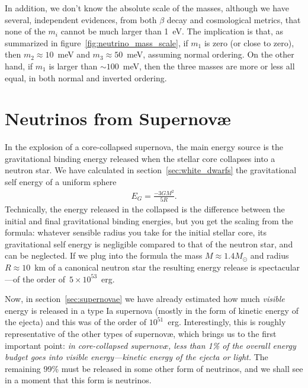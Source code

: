 In addition, we don't know the absolute scale of the masses, although we have several,
independent evidences, from both $\beta$ decay and cosmological metrics, that none
of the $m_i$ cannot be much larger than 1~eV. The implication is that, as summarized in
figure~\ref{fig:neutrino_mass_scale}, if $m_1$ is zero (or close to zero), then
$m_2 \approx 10$~meV and $m_3 \approx 50$~meV, assuming normal ordering. On the
other hand, if $m_1$ is larger than $\sim 100$~meV, then the three masses are more
or less all equal, in both normal and inverted ordering.

\section{Neutrinos from Supernov\ae}

In the explosion of a core-collapsed supernova, the main energy source is the
gravitational binding energy released when the stellar core collapses into a
neutron star. We have calculated in section~\ref{sec:white_dwarfs} the
gravitational self energy of a uniform sphere
\begin{align*}
  E_G = \frac{-3 G M^2}{5R}.
\end{align*}
Technically, the energy released in the collapsed is the difference between the
initial and final gravitational binding energies, but you get the scaling from the
formula: whatever sensible radius you take for the initial stellar core, its
gravitational self energy is negligible compared to that of the neutron star, and
can be neglected. If we plug into the formula the mass $M \approx 1.4 M_\odot$ and
radius $R \approx 10$~km of a canonical neutron star the resulting energy release
is spectacular---of the order of~$5 \times 10^{53}$~erg.

Now, in section~\ref{sec:supernovae} we have already estimated how much \emph{visible}
energy is released in a type Ia supernova (mostly in the form of kinetic energy of the
ejecta) and this was of the order of $10^{51}$~erg. Interestingly, this is roughly
representative of the other types of supernov\ae, which brings us to the first important
point: \emph{in core-collapsed supernov\ae, less than 1\% of the overall energy budget
goes into visible energy---kinetic energy of the ejecta or light.} The remaining 99\%
must be released in some other form of neutrinos, and we shall see in a moment that
this form is neutrinos.


